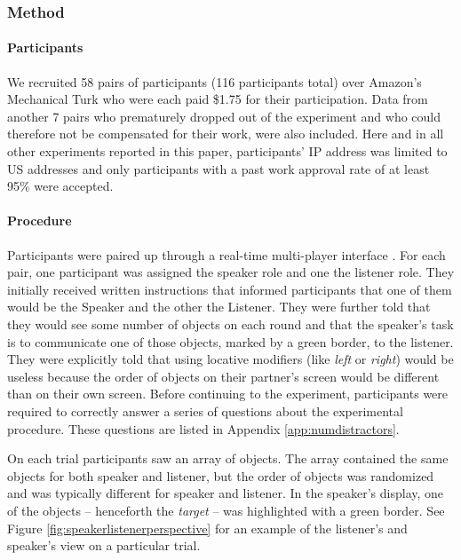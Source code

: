 \documentclass[11pt]{article}
\newcommand{\figref}[1]{Figure \ref{#1}}
\newcommand{\appref}[1]{Appendix \ref{#1}}
\begin{document}
\subsubsection{Method}

\paragraph{Participants}

We recruited 58 pairs of participants (116 participants total) over Amazon's Mechanical Turk who were each paid \$1.75 for their participation. Data from another 7 pairs who prematurely dropped out of the experiment and who could therefore not be compensated for their work, were also included. Here and in all other experiments reported in this paper, participants' IP address was limited to US addresses and only participants with a past work approval rate of at least 95\% were accepted. 

\paragraph{Procedure}

Participants were paired up through a real-time multi-player interface \cite{Hawkins15_RealTimeWebExperiments}. For each pair, one participant was assigned the speaker role and one the listener role. They  initially received written instructions that informed participants that one of them would be the Speaker and the other the Listener. They were further told that they would see some number of objects on each round and that the speaker's task is to communicate one of those objects, marked by a green border, to the listener. They were explicitly told that using locative modifiers (like \emph{left} or \emph{right}) would be useless because the order of objects on their partner's screen would be different than on their own screen. Before continuing to the experiment, participants were required to correctly answer a series of questions about the experimental procedure. These questions are listed in \appref{app:numdistractors}.

On each trial participants saw an array of objects. The array contained the same objects for both speaker and listener, but the order of objects was randomized and was typically different for speaker and listener. In the speaker's display, one of the objects -- henceforth the \emph{target} -- was highlighted with a green border. See \figref{fig:speakerlistenerperspective} for an example of the listener's and speaker's view on a particular trial.
\end{document}
